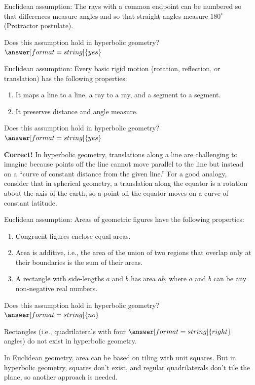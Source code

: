 \documentclass{ximera}
\begin{document}
\begin{problem} %
Euclidean assumption:  The rays with a common endpoint can be numbered so that differences measure angles and so that straight angles measure $180^\circ$ (Protractor postulate).  

Does this assumption hold in hyperbolic geometry? 
$\answer[format=string]{yes}$
\end{problem}

\begin{problem} %
Euclidean assumption: Every basic rigid motion (rotation, reflection, or translation) has the following properties: 
\begin{enumerate}
\item It maps a line to a line, a ray to a ray, and a segment to a segment.
\item It preserves distance and angle measure.
\end{enumerate}

Does this assumption hold in hyperbolic geometry? 
$\answer[format=string]{yes}$
\begin{feedback}[correct]
\textbf{Correct!} In hyperbolic geometry, translations along a line are challenging to imagine because points off the line cannot move parallel to the line but instead on a ``curve of constant distance from the given line.''  For a good analogy, consider that in spherical geometry, a translation along the equator is a rotation about the axis of the earth, so a point off the equator moves on a curve of constant latitude.
\end{feedback}
\end{problem}

\begin{problem} %
Euclidean assumption:  Areas of geometric figures have the following properties: 
\begin{enumerate}
\item Congruent figures enclose equal areas.
\item Area is additive, i.e., the area of the union of two regions that overlap only at their boundaries is the sum of their areas. 
\item A rectangle with side-lengths $a$ and $b$ has area $ab$, where $a$ and $b$ can be any non-negative real numbers.
\end{enumerate}

Does this assumption hold in hyperbolic geometry? 
$\answer[format=string]{no}$
\begin{problem}
Rectangles (i.e., quadrilaterals with four $\answer[format=string]{right}$ angles) do not exist in hyperbolic geometry.    

In Euclidean geometry, area can be based on tiling with unit squares.  But in hyperbolic geometry, squares don't exist, and regular quadrilaterals don't tile the plane, so another approach is needed. 
\end{problem}
\end{problem}
\end{document}
